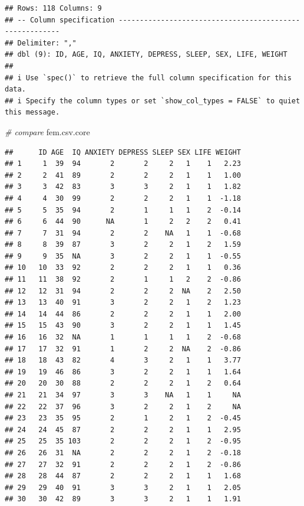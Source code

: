 \documentclass[
]{book}
\newenvironment{Shaded}{\begin{snugshade}}{\end{snugshade}}
\newcommand{\CommentTok}[1]{\textcolor[rgb]{0.56,0.35,0.01}{\textit{#1}}}
\newcommand{\NormalTok}[1]{#1}
\theoremstyle{definition}
\theoremstyle{definition}
\theoremstyle{definition}
\theoremstyle{definition}
\theoremstyle{remark}
\begin{document}
\begin{verbatim}
## Rows: 118 Columns: 9
## -- Column specification --------------------------------------------------------
## Delimiter: ","
## dbl (9): ID, AGE, IQ, ANXIETY, DEPRESS, SLEEP, SEX, LIFE, WEIGHT
## 
## i Use `spec()` to retrieve the full column specification for this data.
## i Specify the column types or set `show_col_types = FALSE` to quiet this message.
\end{verbatim}

\begin{Shaded}
\begin{Highlighting}[]
\CommentTok{\# compare}
\NormalTok{fem.csv.core}
\end{Highlighting}
\end{Shaded}

\begin{verbatim}
##      ID AGE  IQ ANXIETY DEPRESS SLEEP SEX LIFE WEIGHT
## 1     1  39  94       2       2     2   1    1   2.23
## 2     2  41  89       2       2     2   1    1   1.00
## 3     3  42  83       3       3     2   1    1   1.82
## 4     4  30  99       2       2     2   1    1  -1.18
## 5     5  35  94       2       1     1   1    2  -0.14
## 6     6  44  90      NA       1     2   2    2   0.41
## 7     7  31  94       2       2    NA   1    1  -0.68
## 8     8  39  87       3       2     2   1    2   1.59
## 9     9  35  NA       3       2     2   1    1  -0.55
## 10   10  33  92       2       2     2   1    1   0.36
## 11   11  38  92       2       1     1   2    2  -0.86
## 12   12  31  94       2       2     2  NA    2   2.50
## 13   13  40  91       3       2     2   1    2   1.23
## 14   14  44  86       2       2     2   1    1   2.00
## 15   15  43  90       3       2     2   1    1   1.45
## 16   16  32  NA       1       1     1   1    2  -0.68
## 17   17  32  91       1       2     2  NA    2  -0.86
## 18   18  43  82       4       3     2   1    1   3.77
## 19   19  46  86       3       2     2   1    1   1.64
## 20   20  30  88       2       2     2   1    2   0.64
## 21   21  34  97       3       3    NA   1    1     NA
## 22   22  37  96       3       2     2   1    2     NA
## 23   23  35  95       2       1     2   1    2  -0.45
## 24   24  45  87       2       2     2   1    1   2.95
## 25   25  35 103       2       2     2   1    2  -0.95
## 26   26  31  NA       2       2     2   1    2  -0.18
## 27   27  32  91       2       2     2   1    2  -0.86
## 28   28  44  87       2       2     2   1    1   1.68
## 29   29  40  91       3       3     2   1    1   2.05
## 30   30  42  89       3       3     2   1    1   1.91

\end{verbatim}
\end{document}

